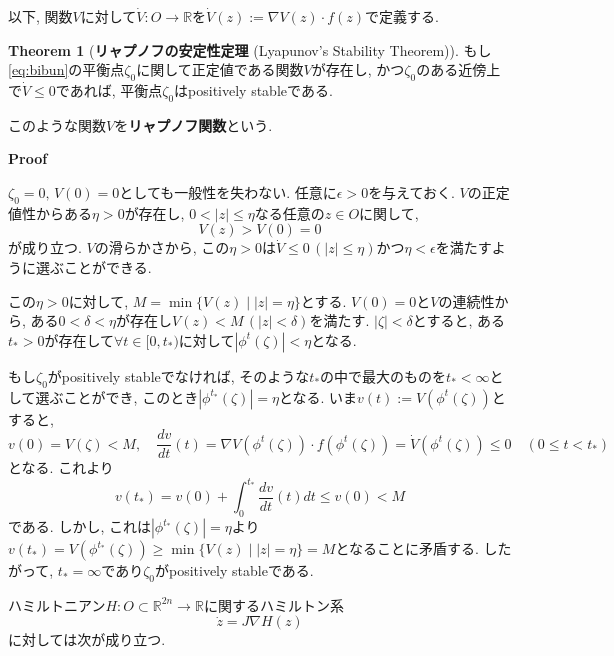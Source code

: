 \documentclass[a4paper]{ujarticle}
\makeatletter
\theoremstyle{definition}
\newtheorem{theorem}{Theorem}
\renewenvironment{proof}[1][Proof]{\par
  \pushQED{\qed}%
  \normalfont \topsep6\p@\@plus6\p@\relax
  \trivlist
  \item\relax
  {\bfseries
  #1\@addpunct{.}}\hspace\labelsep\ignorespaces
}{%
  \popQED\endtrivlist\@endpefalse
}
\makeatother
\begin{document}
    以下, 関数$V$に対して$\dot{V} : O \rightarrow \mathbb{R}$を$\dot{V}(z) := \nabla V(z) \cdot f(z)$で定義する.
    \begin{theorem}[\textbf{リャプノフの安定性定理} (Lyapunov's Stability Theorem)]
        もし\eqref{eq:bibun}の平衡点$\zeta_0$に関して正定値である関数$V$が存在し, 
        かつ$\zeta_0$のある近傍上で$\dot{V} \leq 0$であれば,
        平衡点$\zeta_0$はpositively stableである.
    \end{theorem}
    このような関数$V$を\textbf{リャプノフ関数}という.
    \begin{proof}
        $\zeta_0 = 0, \, V(0) = 0$としても一般性を失わない.
        任意に$\epsilon > 0$を与えておく.
        $V$の正定値性からある$\eta > 0$が存在し, $0 < |z| \leq \eta$なる任意の$z \in O$に関して, 
        \[
            V(z) > V(0) = 0
        \]
        が成り立つ. 
        $V$の滑らかさから, この$\eta > 0$は$\dot{V} \leq 0 \, (|z| \leq \eta)$かつ$\eta < \epsilon$を満たすように選ぶことができる.

        この$\eta > 0$に対して, $M = \min \{V(z) \mid |z| = \eta\}$とする. 
        $V(0) = 0$と$V$の連続性から, ある$0 < \delta < \eta$が存在し$V(z) < M \, (|z| < \delta)$を満たす.
        $|\zeta| < \delta$とすると, ある$t_{*} > 0$が存在して$\forall t \in [0, t_{*})$に対して$|\phi^{t}(\zeta)| < \eta$となる.

        もし$\zeta_0$がpositively stableでなければ, そのような$t_{*}$の中で最大のものを$t_{*} < \infty$として選ぶことができ, 
        このとき$|\phi^{t_{*}}(\zeta)| = \eta$となる.
        いま$v(t) := V(\phi^{t}(\zeta))$とすると, 
        \[
            v(0) = V(\zeta) < M, \quad \frac{d v}{dt}(t) = \nabla V(\phi^{t}(\zeta)) \cdot f(\phi^{t}(\zeta)) = \dot{V}(\phi^{t}(\zeta)) \leq 0 \quad (0 \leq t < t_{*})
        \]
        となる. これより
        \[
            v(t_{*}) = v(0) + \int^{t_{*}}_{0} \frac{d v}{dt}(t) d t \leq v(0) < M
        \]
        である. しかし, これは$|\phi^{t_{*}}(\zeta)| = \eta$より$v(t_{*}) = V(\phi^{t_{*}}(\zeta)) \geq \min \{V(z) \mid |z| = \eta\} = M$となることに矛盾する.
        したがって, $t_{*} = \infty$であり$\zeta_0$がpositively stableである. 
    \end{proof}

    ハミルトニアン$H : O \subset \mathbb{R}^{2n} \rightarrow \mathbb{R}$に関するハミルトン系
    \begin{equation} \label{eq:ham}
        \dot{z} = J \nabla H(z)
    \end{equation}
    に対しては次が成り立つ.
\end{document}

